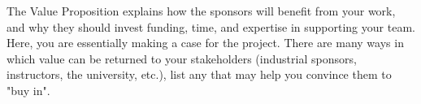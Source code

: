 The Value Proposition explains how the sponsors will benefit from your work, and why they should invest funding, time, and expertise in supporting your team. Here, you are essentially making a case for the project. There are many ways in which value can be returned to your stakeholders (industrial sponsors, instructors, the university, etc.), list any that may help you convince them to "buy in".